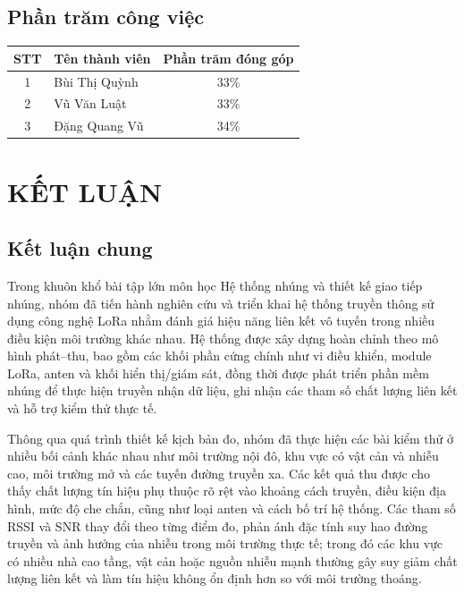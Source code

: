 \documentclass{article}
\begin{document}
	\subsection*{Phần trăm công việc}
	
	\begin{table}[H]
		\centering
		\renewcommand{\arraystretch}{1.2}
		\begin{tabular}{|c|p{5.5cm}|c|}
			\hline
			\textbf{STT} & \textbf{Tên thành viên} & \textbf{Phần trăm đóng góp} \\ \hline
			
			1 & Bùi Thị Quỳnh & 33\% \\ \hline
			
			2 & Vũ Văn Luật & 33\% \\ \hline
			
			3 & Đặng Quang Vũ & 34\% \\ \hline
			
		\end{tabular}
	\end{table}
	
	\newpage
	
	\section*{KẾT LUẬN}
	
	\subsection*{Kết luận chung}
	
	Trong khuôn khổ bài tập lớn môn học Hệ thống nhúng và thiết kế giao tiếp nhúng, nhóm đã tiến hành nghiên cứu và triển khai hệ thống truyền thông sử dụng công nghệ LoRa nhằm đánh giá hiệu năng liên kết vô tuyến trong nhiều điều kiện môi trường khác nhau. Hệ thống được xây dựng hoàn chỉnh theo mô hình phát--thu, bao gồm các khối phần cứng chính như vi điều khiển, module LoRa, anten và khối hiển thị/giám sát, đồng thời được phát triển phần mềm nhúng để thực hiện truyền nhận dữ liệu, ghi nhận các tham số chất lượng liên kết và hỗ trợ kiểm thử thực tế.
	
	Thông qua quá trình thiết kế kịch bản đo, nhóm đã thực hiện các bài kiểm thử ở nhiều bối cảnh khác nhau như môi trường nội đô, khu vực có vật cản và nhiễu cao, môi trường mở và các tuyến đường truyền xa. Các kết quả thu được cho thấy chất lượng tín hiệu phụ thuộc rõ rệt vào khoảng cách truyền, điều kiện địa hình, mức độ che chắn, cũng như loại anten và cách bố trí hệ thống. Các tham số RSSI và SNR thay đổi theo từng điểm đo, phản ánh đặc tính suy hao đường truyền và ảnh hưởng của nhiễu trong môi trường thực tế; trong đó các khu vực có nhiều nhà cao tầng, vật cản hoặc nguồn nhiễu mạnh thường gây suy giảm chất lượng liên kết và làm tín hiệu không ổn định hơn so với môi trường thoáng.
	
\end{document}
